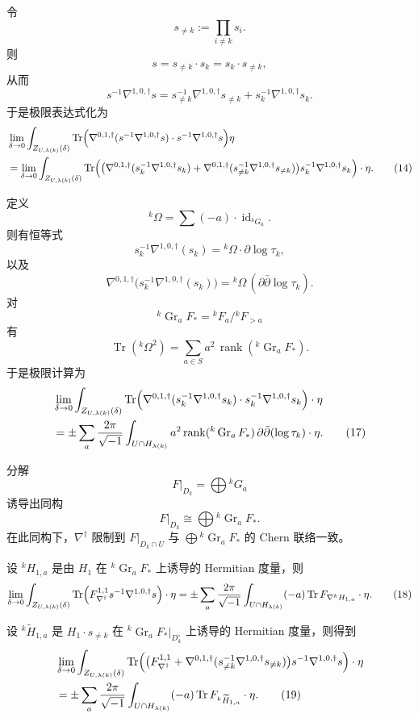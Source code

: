 \documentclass[12pt,a4paper]{article}
\newcommand{\rank}{\operatorname{rank}}
\newcommand{\Tr}{\operatorname{Tr}}
\newcommand{\Gr}{\operatorname{Gr}}
\newcommand{\Id}{\operatorname{id}}
\begin{document}
令
\[
s_{\ne k}:=\prod_{i\ne k}s_i.
\]
则
\[
s=s_{\ne k}\cdot s_k=s_k\cdot s_{\ne k},
\]
从而
\[
s^{-1}\nabla^{1,0,\dagger}s
=
s_{\ne k}^{-1}\nabla^{1,0,\dagger}s_{\ne k}
+
s_k^{-1}\nabla^{1,0,\dagger}s_k. \tag{13}
\]
于是极限表达式化为
\begin{align}
&\lim_{\delta\to 0}
\int_{Z_{U,\lambda(k)}(\delta)}
\Tr\Bigl(
\nabla^{0,1,\dagger}(s^{-1}\nabla^{1,0,\dagger}s)\cdot s^{-1}\nabla^{1,0,\dagger}s
\Bigr)\eta
\nonumber\\
&=
\lim_{\delta\to 0}
\int_{Z_{U,\lambda(k)}(\delta)}
\Tr\Bigl(
\bigl(\nabla^{0,1,\dagger}(s_k^{-1}\nabla^{1,0,\dagger}s_k)
+\nabla^{0,1,\dagger}(s_{\ne k}^{-1}\nabla^{1,0,\dagger}s_{\ne k})\bigr)
s_k^{-1}\nabla^{1,0,\dagger}s_k
\Bigr)\cdot \eta. \tag{14}
\end{align}

定义
\[
{}^k\Omega=\sum (-a)\cdot \Id_{{}^kG_a}.
\]
则有恒等式
\[
s_k^{-1}\nabla^{1,0,\dagger}(s_k)={}^k\Omega\cdot \partial \log\tau_k, \tag{15}
\]
以及
\[
\nabla^{0,1,\dagger}\bigl(s_k^{-1}\nabla^{1,0,\dagger}(s_k)\bigr)
=
{}^k\Omega\,(\partial\bar\partial \log\tau_k). \tag{16}
\]
对
\[
{}^k\Gr_aF_*={}^kF_a/{}^kF_{>a}
\]
有
\[
\Tr({}^k\Omega^2)=\sum_{a\in S} a^2\,\rank({}^k\Gr_aF_*).
\]
于是极限计算为
\begin{align}
&\lim_{\delta\to 0}
\int_{Z_{U,\lambda(k)}(\delta)}
\Tr\Bigl(
\nabla^{0,1,\dagger}(s_k^{-1}\nabla^{1,0,\dagger}s_k)\cdot s_k^{-1}\nabla^{1,0,\dagger}s_k
\Bigr)\cdot \eta
\nonumber\\
&=
\pm \sum_a \frac{2\pi}{\sqrt{-1}}
\int_{U\cap H_{\lambda(k)}}
a^2 \rank({}^k\Gr_aF_*)\,\partial\bar\partial(\log\tau_k)\cdot \eta. \tag{17}
\end{align}

分解
\[
F|_{D_k}=\bigoplus {}^kG_a
\]
诱导出同构
\[
F|_{D_k}\cong \bigoplus {}^k\Gr_aF_*.
\]
在此同构下，\(\nabla^\dagger\) 限制到 \(F|_{D_k\cap U}\) 与 \(\bigoplus {}^k\Gr_aF_*\) 的 Chern 联络一致。

设 \({}^kH_{1,a}\) 是由 \(H_1\) 在 \({}^k\Gr_aF_*\) 上诱导的 Hermitian 度量，则
\begin{align}
\lim_{\delta\to 0}
\int_{Z_{U,\lambda(k)}(\delta)}
\Tr\Bigl(
F_{\nabla^\dagger}^{1,1}s^{-1}\nabla^{1,0,\dagger}s
\Bigr)\cdot \eta
=
\pm \sum_a \frac{2\pi}{\sqrt{-1}}
\int_{U\cap H_{\lambda(k)}}
(-a)\Tr F_{\nabla^kH_{1,a}}\cdot \eta. \tag{18}
\end{align}

设 \({}^k\widetilde H_{1,a}\) 是 \(H_1\cdot s_{\ne k}\) 在 \({}^k\Gr_aF_*|_{D_k^\circ}\) 上诱导的 Hermitian 度量，则得到
\begin{align}
&\lim_{\delta\to 0}
\int_{Z_{U,\lambda(k)}(\delta)}
\Tr\Bigl(
\bigl(F_{\nabla^\dagger}^{1,1}
+\nabla^{0,1,\dagger}(s_{\ne k}^{-1}\nabla^{1,0,\dagger}s_{\ne k})\bigr)
s^{-1}\nabla^{1,0,\dagger}s
\Bigr)\cdot \eta
\nonumber\\
&=
\pm \sum_a \frac{2\pi}{\sqrt{-1}}
\int_{U\cap H_{\lambda(k)}}
(-a)\Tr F_{{}^k\widetilde H_{1,a}}\cdot \eta. \tag{19}
\end{align}
\end{document}
